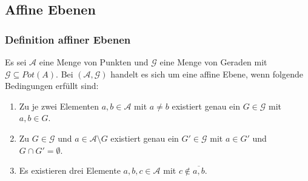 \documentclass{beamer}
\theoremstyle{plain}
\theoremstyle{definition}
\theoremstyle{rem}
\begin{document}
\subsection{Affine Ebenen}
\begin{frame}
    \frametitle{Definition affiner Ebenen}
    \begin{definition}
        Es sei $\mathcal{A}$ eine Menge von Punkten und $\mathcal{G}$ eine Menge von Geraden mit $\mathcal{G} \subseteq Pot(A)$.
        Bei $(\mathcal{A},\mathcal{G})$ handelt es sich um eine affine Ebene, wenn folgende Bedingungen erfüllt sind:
        \begin{enumerate}[<+->]
            \item Zu je zwei Elementen $a, b\in \mathcal{A}$ mit $a\ne b$ existiert genau ein $G\in\mathcal{G}$ mit $a, b \in G$. \\
            \item Zu $G\in\mathcal{G}$ und $a\in\mathcal{A}\setminus G$ existiert genau ein $G'\in\mathcal{G}$ mit $a\in G'$ und $G\cap G'=\emptyset$. \\
            \item Es existieren drei Elemente $a,b,c\in\mathcal{A}$ mit $c\notin\overline{a,b}$. \\
        \end{enumerate}
    \end{definition}
\end{frame}
\end{document}
